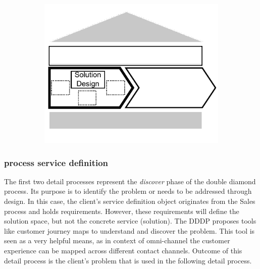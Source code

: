 	 \begin{figure}[caption={Solution Design process}, label={fig:soldes}]
	 	\begin{subfigure}[c]{.45\textwidth}
	 		\begin{center}
	 			\includegraphics{figures/processes/solutiondesign.pdf}
	 		\end{center}
	 	\end{subfigure}
	 	\begin{subfigure}[c]{.45\textwidth}
	 		\begin{center}
	 		\end{center}
	 	\end{subfigure}
	 	
	 \end{figure}
 
 	\subsubsection{process service definition}
 	The first two detail processes represent the \textit{discover} phase of the double diamond process. Its purpose is to identify the problem or needs to be addressed through design. In this case, the client's service definition object originates from the Sales process and holds requirements. However, these requirements will define the solution space, but not the concrete service (solution). The \acrshort{DDDP} proposes tools like customer journey maps to understand and discover the problem. This tool is seen as a very helpful means, as in context of omni-channel the customer experience can be mapped across different contact channels. Outcome of this detail process is the client's problem that is used in the following detail process. 
 	
